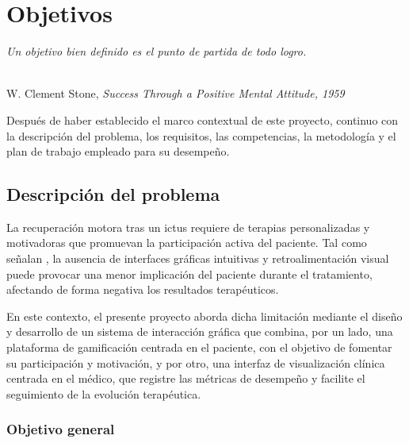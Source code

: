 \chapter{Objetivos}
\label{cap:capitulo2}

\begin{flushright}
\begin{minipage}[]{11cm}
\emph{Un objetivo bien definido es el punto de partida de todo logro.}\\
\end{minipage}\\

W. Clement Stone, \textit{Success Through a Positive Mental Attitude, 1959}\\
\end{flushright}

\vspace{1cm}
\setcounter{footnote}{0}

Después de haber establecido el marco contextual de este proyecto, continuo con la descripción del problema, los requisitos, las competencias, la metodología y el plan de trabajo empleado para su desempeño.\\

\section{Descripción del problema}
\label{sec:descripcion}

La recuperación motora tras un ictus requiere de terapias personalizadas y motivadoras que promuevan la participación activa del paciente.
Tal como señalan \cite{perales6a}, la ausencia de interfaces gráficas intuitivas y retroalimentación visual puede provocar una menor implicación del paciente durante el tratamiento, afectando de forma negativa los resultados terapéuticos.

En este contexto, el presente proyecto aborda dicha limitación mediante el diseño y desarrollo de un sistema de interacción gráfica que combina, por un lado, una plataforma de gamificación centrada en el paciente, con el objetivo de fomentar su participación y motivación, 
y por otro, una interfaz de visualización clínica centrada en el médico, que registre las métricas de desempeño y facilite el seguimiento de la evolución terapéutica.

\subsection{Objetivo general}
\label{sec:descripcion}

